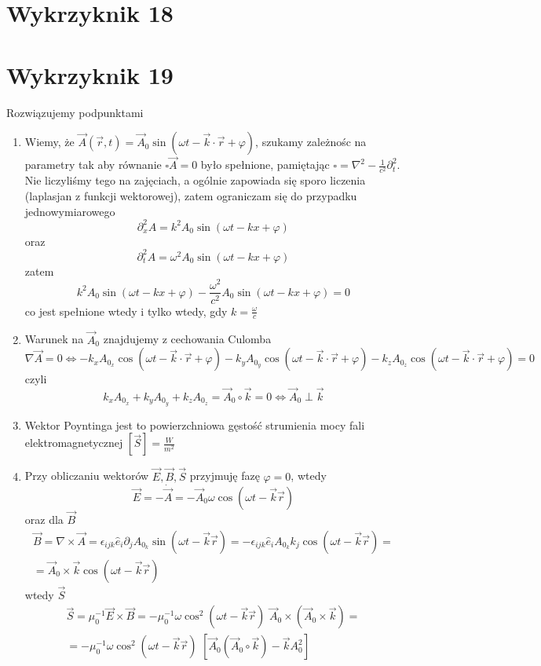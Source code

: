 \documentclass[a4paper,12pt]{article}
\begin{document}
\section{Wykrzyknik 18}

\section{Wykrzyknik 19}
	Rozwiązujemy podpunktami
	\begin{enumerate}
		\item Wiemy, że $\vec{A}(\vec{r},t) = \vec{A}_0 \sin(\omega t - \vec{k}\cdot\vec{r}+\varphi)$, szukamy zależnośc na parametry tak aby
		równanie $\square\vec{A}=0$ było spełnione, pamiętając $\square = \nabla^2 - \frac{1}{c^2}\partial_t^2$.\\
		Nie liczyliśmy tego na zajęciach, a ogólnie zapowiada się sporo liczenia (laplasjan z funkcji wektorowej), zatem ograniczam się do przypadku jednowymiarowego
		$$
			\partial_x^2 A = k^2 A_0 \sin(\omega t - kx +\varphi)
		$$
		oraz
		$$
			\partial_t^2 A = \omega^2 A_0\sin(\omega t - kx+\varphi)
		$$
		zatem 
		$$
			 k^2 A_0 \sin(\omega t - kx +\varphi) - \frac{\omega^2}{c^2}A_0\sin(\omega t - kx+\varphi) = 0 
		$$
		co jest spełnione wtedy i tylko wtedy, gdy $k = \frac{\omega}{c}$
		\item Warunek na $\vec{A}_0$ znajdujemy z cechowania Culomba
		$$
			\nabla \vec{A} = 0 \Leftrightarrow -k_xA_{0_x} \cos(\omega t - \vec{k}\cdot\vec{r}+\varphi) - k_yA_{0_y}\cos(\omega t - \vec{k}\cdot\vec{r}+\varphi)
			-k_z A_{0_z} \cos(\omega t - \vec{k}\cdot\vec{r}+\varphi) = 0 
		$$
		czyli 
		$$
			k_xA_{0_x} + k_yA_{0_y} + k_zA_{0_z} = \vec{A}_0 \circ \vec{k} = 0  \Leftrightarrow \vec{A}_0 \perp \vec{k}
		$$
		\item Wektor Poyntinga jest to powierzchniowa gęstość strumienia mocy fali elektromagnetycznej $[\vec{S}] = \frac{W}{m^2}$
		\item Przy obliczaniu wektorów $\vec{E},\vec{B},\vec{S}$ przyjmuję fazę $\varphi =0$, wtedy
		$$
			\vec{E} = -\dot{\vec{A}} = -\vec{A}_0\omega\cos(\omega t -\vec{k}\vec{r})
		$$
		oraz dla $\vec{B}$
		$$
		\begin{array}{l}
			\vec{B} = \nabla\times\vec{A} = \epsilon_{ijk}\hat{e}_i\partial_j A_{0_k}\sin(\omega t-\vec{k}\vec{r}) = -\epsilon_{ijk}\hat{e}_i A_{0_k}k_j\cos(\omega t-\vec{k}\vec{r}) =\\
			=\vec{A}_0\times\vec{k}\cos(\omega t-\vec{k}\vec{r})
		\end{array}
		$$
		wtedy $\vec{S}$
		$$
		\begin{array}{l}
			\vec{S}=\mu_0^{-1}\vec{E}\times\vec{B} = -\mu_0^{-1}\omega\cos^2(\omega t-\vec{k}\vec{r})\,\,\vec{A}_0\times(\vec{A}_0\times\vec{k}) =\\
			= -\mu_0^{-1}\omega\cos^2(\omega t-\vec{k}\vec{r})\,\, \left[\vec{A}_0(\vec{A}_0\circ\vec{k})-\vec{k}A_0^2\right]
		\end{array}
		$$
	\end{enumerate}
\end{document}

